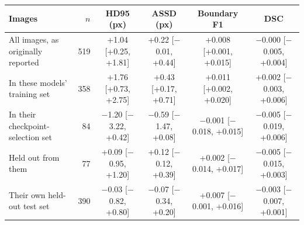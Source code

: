 \begin{tabular}{lrcccc}
\toprule
Images & $n$ & HD95 (px) & ASSD (px) & Boundary F1 & DSC \\
\midrule
All images, as originally reported & 519 & +1.04 [+0.25, +1.81] & +0.22 [$-$0.01, +0.44] & +0.008 [+0.001, +0.015] & $-$0.000 [$-$0.005, +0.004] \\
In these models' training set & 358 & +1.76 [+0.73, +2.75] & +0.43 [+0.17, +0.71] & +0.011 [+0.002, +0.020] & +0.002 [$-$0.003, +0.006] \\
In their checkpoint-selection set & 84 & $-$1.20 [$-$3.22, +0.42] & $-$0.59 [$-$1.47, +0.08] & $-$0.001 [$-$0.018, +0.015] & $-$0.005 [$-$0.019, +0.006] \\
Held out from them & 77 & +0.09 [$-$0.95, +1.20] & +0.12 [$-$0.12, +0.39] & +0.002 [$-$0.014, +0.017] & $-$0.005 [$-$0.015, +0.003] \\
\midrule
Their own held-out test set & 390 & $-$0.03 [$-$0.82, +0.80] & $-$0.07 [$-$0.34, +0.20] & +0.007 [$-$0.001, +0.016] & $-$0.003 [$-$0.007, +0.001] \\
\bottomrule
\end{tabular}
